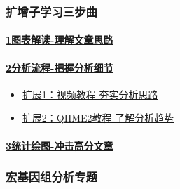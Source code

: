 \documentclass[]{article}
\providecommand{\tightlist}{%
  \setlength{\itemsep}{0pt}\setlength{\parskip}{0pt}}
\numberwithin{figure}{section}
\numberwithin{table}{section}
\begin{document}
\hypertarget{ux6269ux589eux5b50ux5b66ux4e60ux4e09ux6b65ux66f2}{%
\subsubsection{扩增子学习三步曲}\label{ux6269ux589eux5b50ux5b66ux4e60ux4e09ux6b65ux66f2}}

\hypertarget{ux56feux8868ux89e3ux8bfb-ux7406ux89e3ux6587ux7ae0ux601dux8def}{%
\paragraph{\texorpdfstring{\href{http://mp.weixin.qq.com/s/oiVHO2S1JgYrKXPDU6fH2g}{1图表解读-理解文章思路}}{1图表解读-理解文章思路}}\label{ux56feux8868ux89e3ux8bfb-ux7406ux89e3ux6587ux7ae0ux601dux8def}}

\hypertarget{ux5206ux6790ux6d41ux7a0b-ux628aux63e1ux5206ux6790ux7ec6ux8282}{%
\paragraph{\texorpdfstring{\href{http://mp.weixin.qq.com/s/KrYyy3jjzAL0rQzVfV6h4A}{2分析流程-把握分析细节}}{2分析流程-把握分析细节}}\label{ux5206ux6790ux6d41ux7a0b-ux628aux63e1ux5206ux6790ux7ec6ux8282}}

\begin{itemize}
\tightlist
\item
  \href{http://mp.weixin.qq.com/s/SxWl0qBJgg8ziZUFDmKvpQ}{扩展1：视频教程-夯实分析思路}\\
\item
  \href{http://mp.weixin.qq.com/s/wkn-91BVOSWZLRvlcaaEgg}{扩展2：QIIME2教程-了解分析趋势}
\end{itemize}

\hypertarget{ux7edfux8ba1ux7ed8ux56fe-ux51b2ux51fbux9ad8ux5206ux6587ux7ae0}{%
\paragraph{\texorpdfstring{\href{http://mp.weixin.qq.com/s/6tNePiaDsPPzEBZjiCXIRg}{3统计绘图-冲击高分文章}}{3统计绘图-冲击高分文章}}\label{ux7edfux8ba1ux7ed8ux56fe-ux51b2ux51fbux9ad8ux5206ux6587ux7ae0}}

\hypertarget{ux5b8fux57faux56e0ux7ec4ux5206ux6790ux4e13ux9898-1}{%
\subsubsection{宏基因组分析专题}\label{ux5b8fux57faux56e0ux7ec4ux5206ux6790ux4e13ux9898-1}}
\end{document}
